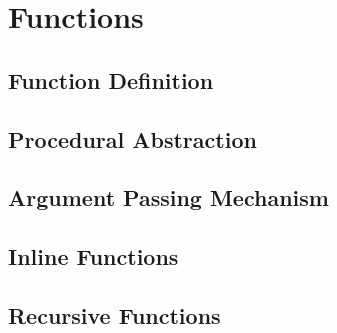 \chapter{Functions}

\section{Function Definition}

\section{Procedural Abstraction}

\section{Argument Passing Mechanism}

\section{Inline Functions}

\section{Recursive Functions}
